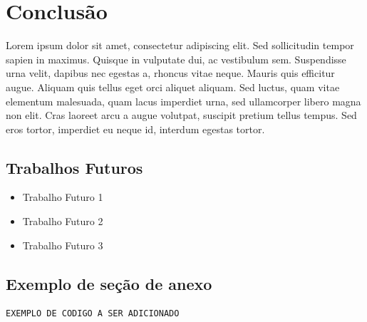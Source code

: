 \documentclass[
	12pt,				%
	openright,			%
	oneside,			%
	a4paper,			%
	english,			%
	brazil				%
	]{abntex2}
\begin{document}
 \chapter{Conclusão}

 Lorem ipsum dolor sit amet, consectetur adipiscing elit. Sed sollicitudin tempor sapien in maximus. Quisque in vulputate dui, ac vestibulum sem. Suspendisse urna velit, dapibus nec egestas a, rhoncus vitae neque. Mauris quis efficitur augue. Aliquam quis tellus eget orci aliquet aliquam. Sed luctus, quam vitae elementum malesuada, quam lacus imperdiet urna, sed ullamcorper libero magna non elit. Cras laoreet arcu a augue volutpat, suscipit pretium tellus tempus. Sed eros tortor, imperdiet eu neque id, interdum egestas tortor.

 \section{Trabalhos Futuros}

\begin{itemize}
    \item Trabalho Futuro 1
    \item Trabalho Futuro 2
    \item Trabalho Futuro 3
\end{itemize}

\postextual



\begin{apendicesenv}

\partapendices

\chapter{\label{AnexoA}Exemplo de seção de anexo}

\begin{lstlisting}
EXEMPLO DE CODIGO A SER ADICIONADO
\end{lstlisting}

\end{apendicesenv}
\end{document}
